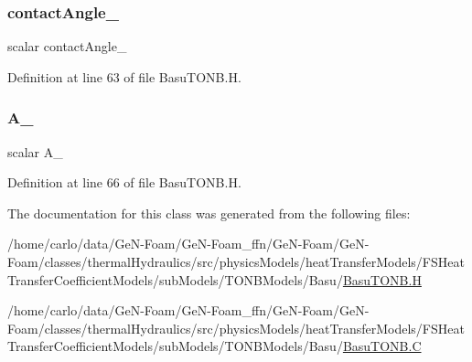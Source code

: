 \mbox{\label{classFoam_1_1TONBModels_1_1Basu_ab606bba17ccfd47c1cac008258aa62fd}} 
\subsubsection{\texorpdfstring{contact\+Angle\+\_\+}{contactAngle\_}}
{\footnotesize\ttfamily scalar contact\+Angle\+\_\+\hspace{0.3cm}{\ttfamily [protected]}}



Definition at line 63 of file Basu\+T\+O\+N\+B.\+H.

\mbox{\label{classFoam_1_1TONBModels_1_1Basu_a470f484be0b7ecd159b0971e3023a490}} 
\subsubsection{\texorpdfstring{A\+\_\+}{A\_}}
{\footnotesize\ttfamily scalar A\+\_\+\hspace{0.3cm}{\ttfamily [protected]}}



Definition at line 66 of file Basu\+T\+O\+N\+B.\+H.



The documentation for this class was generated from the following files\+:\begin{DoxyCompactItemize}
\item 
/home/carlo/data/\+Ge\+N-\/\+Foam/\+Ge\+N-\/\+Foam\+\_\+ffn/\+Ge\+N-\/\+Foam/\+Ge\+N-\/\+Foam/classes/thermal\+Hydraulics/src/physics\+Models/heat\+Transfer\+Models/\+F\+S\+Heat\+Transfer\+Coefficient\+Models/sub\+Models/\+T\+O\+N\+B\+Models/\+Basu/\hyperlink{BasuTONB_8H}{Basu\+T\+O\+N\+B.\+H}\item 
/home/carlo/data/\+Ge\+N-\/\+Foam/\+Ge\+N-\/\+Foam\+\_\+ffn/\+Ge\+N-\/\+Foam/\+Ge\+N-\/\+Foam/classes/thermal\+Hydraulics/src/physics\+Models/heat\+Transfer\+Models/\+F\+S\+Heat\+Transfer\+Coefficient\+Models/sub\+Models/\+T\+O\+N\+B\+Models/\+Basu/\hyperlink{BasuTONB_8C}{Basu\+T\+O\+N\+B.\+C}\end{DoxyCompactItemize}
